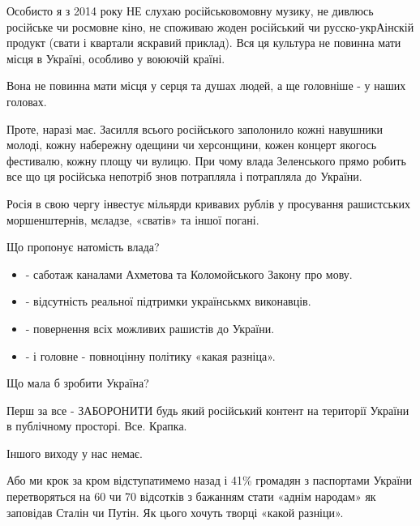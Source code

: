 Особисто я з 2014 року НЕ слухаю російськовомовну музику, не дивлюсь російське
чи росмовне кіно, не споживаю жоден російський чи русско-укрАінскій продукт
(свати і квартали яскравий приклад). Вся ця культура не повинна мати місця в
Україні, особливо у воюючій країні.

Вона не повинна мати місця у серця та душах людей, а ще головніше - у наших
головах.

Проте, наразі має. Засилля всього російського заполонило кожні навушники
молоді, кожну набережну одещини чи херсонщини, кожен концерт якогось фестивалю,
кожну площу чи вулицю. При чому влада Зеленського прямо робить все що ця
російська непотріб знов потрапляла і потрапляла до України. 

Росія в свою чергу інвестує мільярди кривавих рублів у просування рашистських
моршенштернів, мєладзе, «сватів» та іншої погані. 

Що пропонує натомість влада? 

\begin{itemize}
  \item - саботаж каналами Ахметова та Коломойського Закону про мову. 
  \item - відсутність реальної підтримки українськмх виконавців.
  \item - повернення всіх можливих рашистів до України.
  \item - і головне - повноцінну політику «какая разніца».
\end{itemize}

Що мала б зробити Україна? 

Перш за все - ЗАБОРОНИТИ будь який російський контент на території України в
публічному просторі. Все. Крапка.

Іншого виходу у нас немає. 

Або ми крок за кром відступатимемо назад і 41\% громадян з паспортами України
перетворяться на 60 чи 70 відсотків з бажанням стати «аднім народам» як
заповідав Сталін чи Путін. Як цього хочуть творці «какой разніци».

